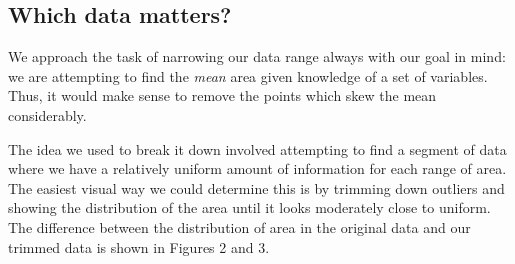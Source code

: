 \documentclass{article}
\begin{document}
\subsection{Which data matters?}

We approach the task of narrowing our data range always with our goal in mind:
we are attempting to find the \emph{mean} area given knowledge of a set of
variables. Thus, it would make sense to remove the points which skew the mean
considerably.

The idea we used to break it down involved attempting to find a segment of data
where we have a relatively uniform amount of information for each range of
area. The easiest visual way we could determine this is by trimming down
outliers and showing the distribution of the area until it looks moderately
close to uniform. The difference between the distribution of area in the
original data and our trimmed data is shown in Figures 2 and 3.
\end{document}
